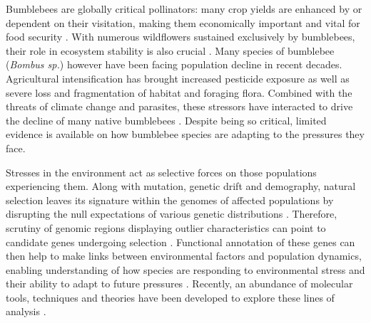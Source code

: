 \documentclass[12pt]{article}
\begin{document}
\begin{linenumbers}
	Bumblebees are globally critical pollinators: many crop yields are enhanced by or dependent on their visitation, making them economically important and vital for food security \citep{goulson_conserving_2003, sun_genus-wide_2021}. With numerous wildflowers sustained exclusively by bumblebees, their role in ecosystem stability is also crucial \citep{goulson_decline_2008, cameron_global_2020}. Many species of bumblebee (\emph{Bombus sp.}) however have been facing population decline in recent decades. Agricultural intensification has brought increased pesticide exposure as well as severe loss and fragmentation of habitat and foraging flora. Combined with the threats of climate change and parasites, these stressors have interacted to drive the decline of many native bumblebees \citep{carvell_declines_2006, oliver_interactions_2014, soroye_climate_2020, outhwaite_agriculture_2022}. Despite being so critical, limited evidence is available on how bumblebee species are adapting to the pressures they face.
	
	
	Stresses in the environment act as selective forces on those populations experiencing them. Along with mutation, genetic drift and demography, natural selection leaves its signature within the genomes of affected populations by disrupting the null expectations of various genetic distributions \citep{hohenlohe_using_2010, vitti_detecting_2013}. Therefore, scrutiny of genomic regions displaying outlier characteristics can point to candidate genes undergoing selection \citep{whitlock_reliable_2015, hoban_finding_2016, ahrens_search_2018}. Functional annotation of these genes can then help to make links between environmental factors and population dynamics, enabling understanding of how species are responding to environmental stress and their ability to adapt to future pressures \citep{hohenlohe_population_2010, pracana_fire_2017, buckley_restriction_2018, mollion_patterns_2017}. 
	Recently, an abundance of molecular tools, techniques and theories have been developed to explore these lines of analysis \citep{bourgeois_overview_2021}. 



\end{linenumbers}
\end{document}

